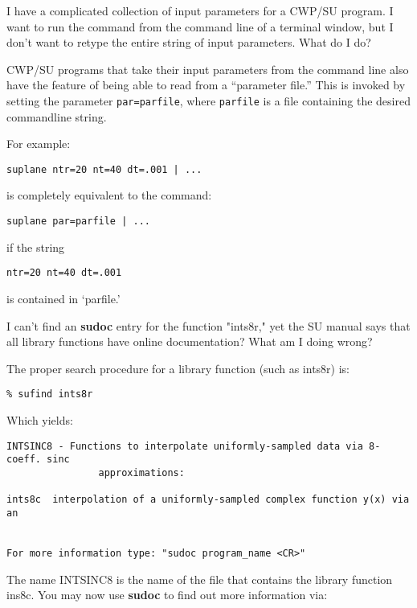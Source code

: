 {{{{{{{\begin{question}
I have a complicated collection of input parameters for a {\sf CWP/SU}
program.  I want to run the command from the command line of a terminal
window, but I don't want to retype the entire string of input parameters.
What do I do?
\end{question}

\begin{rmans}
{\sf CWP/SU} programs that take their input parameters from the command
line also have the feature of being able to read from a
``parameter file.''   This is invoked by setting
the parameter \verb:par=parfile:, where {\tt parfile} is a file containing
the desired commandline string.

For example:
{\small \begin{verbatim}
suplane ntr=20 nt=40 dt=.001 | ...
\end{verbatim}}\noindent
is completely equivalent to the command:
{\small \begin{verbatim}
suplane par=parfile | ...
\end{verbatim}}\noindent
if the string
{\small \begin{verbatim}
ntr=20 nt=40 dt=.001
\end{verbatim}}\noindent
is contained  in `parfile.'
\end{rmans}

\begin{question}
I can't find an {\bf sudoc\/} entry for the function "ints8r," yet the
SU manual says that all library functions have online documentation?
What am I doing wrong?
\end{question}

\begin{rmans}
The proper search procedure for a library function (such as ints8r) is:
{\small \begin{verbatim}
% sufind ints8r
\end{verbatim}} \noindent
Which yields:

\begin{verbatim}
INTSINC8 - Functions to interpolate uniformly-sampled data via 8-coeff. sinc
                approximations:

ints8c  interpolation of a uniformly-sampled complex function y(x) via an


For more information type: "sudoc program_name <CR>"
\end{verbatim}

The name INTSINC8 is the name of the file that contains the
library function ins8c. You may now use {\bf sudoc\/} to find out more
information via:


\end{rmans}}}}}}}}
